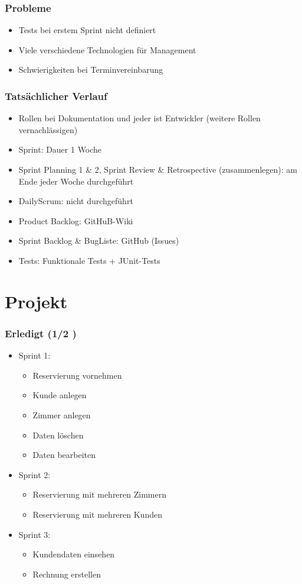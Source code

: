 \documentclass{beamer}
\begin{document}
\begin{frame}
\frametitle{Probleme}
\begin{itemize}
\item Tests bei erstem Sprint nicht definiert
\item Viele verschiedene Technologien f\"ur Management
\item Schwierigkeiten bei Terminvereinbarung
\end{itemize}
\end{frame}

\begin{frame}
\frametitle{Tats\"achlicher Verlauf}
\begin{itemize}
\item Rollen bei Dokumentation und jeder ist Entwickler (weitere Rollen vernachl\"assigen)
\item Sprint: Dauer 1 Woche
\end{itemize}
\begin{itemize}
\item Sprint Planning 1 \& 2, Sprint Review \& Retrospective (zusammenlegen): am Ende jeder Woche durchgef\"uhrt
\item DailyScrum: nicht durchgef\"uhrt
\end{itemize}
\begin{itemize}
\item Product Backlog: GitHuB-Wiki
\item Sprint Backlog \& BugListe: GitHub (Issues)
\item Tests: Funktionale Tests + JUnit-Tests
\end{itemize}
\end{frame}

\section{Projekt}

\begin{frame}
\frametitle{Erledigt (1/2 )}
\begin{itemize}
\item  Sprint 1:
\begin{itemize}
\item  Reservierung vornehmen
\item  Kunde anlegen
\item  Zimmer anlegen
\item  Daten l\"oschen
\item  Daten bearbeiten
\end{itemize}
\item  Sprint 2:
\begin{itemize}
\item  Reservierung mit mehreren Zimmern
\item  Reservierung mit mehreren Kunden
\end{itemize}
\item  Sprint 3:
\begin{itemize}
\item  Kundendaten einsehen
\item  Rechnung erstellen
\end{itemize}
\end{itemize}
\end{frame}
\end{document}
